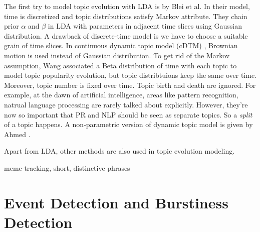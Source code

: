 \documentclass{article}
\begin{document}
The first try to model topic evolution with LDA is by Blei et al\cite{blei2006dynamic}. In their model, time is discretized and topic distributions satisfy Markov attribute. They chain prior $\alpha$ and $\beta$ in LDA with parameters in adjacent time slices using Gaussian distribution. A drawback of discrete-time model is we have to choose a suitable grain of time slices. In continuous dynamic topic model (cDTM) \cite{wang2012continuous}, Brownian motion is used instead of Gaussian distribution. To get rid of the Markov assumption, Wang \cite{wang2006topics} associated a Beta distribution of time with each topic to model topic popularity evolution, but topic distribtuions keep the same over time. Moreover, topic number is fixed over time. Topic birth and death are ignored. For example, at the dawn of artificial intelligence, areas like pattern recognition, natrual language processing are rarely talked about explicitly. However, they're now so important that PR and NLP should be seen as separate topics. So a {\em split} of a topic happens. A non-parametric version of dynamic topic model is given by Ahmed \cite{ahmed2012timeline}.

Apart from LDA, other methods are also used in topic evolution modeling. 

meme-tracking, short, distinctive phrases 

\section {Event Detection and Burstiness Detection}

 

\end{document}
